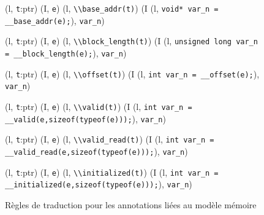 \begin{figure*}[bt]
  \scriptsize{
    {
      {(l, \mbox{\lstinline't'}:ptr) \trule (I, \mbox{\lstinline'e'}) }
      {(l, \mbox{\lstinline'\\base_addr(t)'}) \trule
        (I \concat
        (l, \mbox{\lstinline'void* var_n = __base_addr(e);'}),
        \mbox{\lstinline'var_n'})
      }{}
    }

    {
      {(l, \mbox{\lstinline't'}:ptr) \trule (I, \mbox{\lstinline'e'}) }
      {(l, \mbox{\lstinline'\\block_length(t)'}) \trule
        (I \concat
        (l, \mbox{\lstinline'unsigned long var_n = __block_length(e);'}),
        \mbox{\lstinline'var_n'})
      }{}
    }

    {
      {(l, \mbox{\lstinline't'}:ptr) \trule (I, \mbox{\lstinline'e'}) }
      {(l, \mbox{\lstinline'\\offset(t)'}) \trule
        (I \concat
        (l, \mbox{\lstinline'int var_n = __offset(e);'}),
        \mbox{\lstinline'var_n'})
      }{}
    }

    {
      {(l, \mbox{\lstinline't'}:ptr) \trule (I, \mbox{\lstinline'e'}) }
      {(l, \mbox{\lstinline'\\valid(t)'}) \prule
        (I \concat
        (l, \mbox{\lstinline'int var_n = __valid(e,sizeof(typeof(e)));'}),
        \mbox{\lstinline'var_n'})
      }{}
    }

    {
      {(l, \mbox{\lstinline't'}:ptr) \trule (I, \mbox{\lstinline'e'}) }
      {(l, \mbox{\lstinline'\\valid_read(t)'}) \prule
        (I \concat
        (l, \mbox{\lstinline'int var_n = __valid_read(e,sizeof(typeof(e)));'}),
        \mbox{\lstinline'var_n'})
      }{}
    }

    {
      {(l, \mbox{\lstinline't'}:ptr) \trule (I, \mbox{\lstinline'e'}) }
      {(l, \mbox{\lstinline'\\initialized(t)'}) \prule
        (I \concat
        (l, \mbox{\lstinline'int var_n = __initialized(e,sizeof(typeof(e)));'}),
        \mbox{\lstinline'var_n'})
      }{}
    }
  }
  \caption{Règles de traduction pour les annotations liées au modèle mémoire}
  \label{fig:mem-annots-rules}
\end{figure*}


